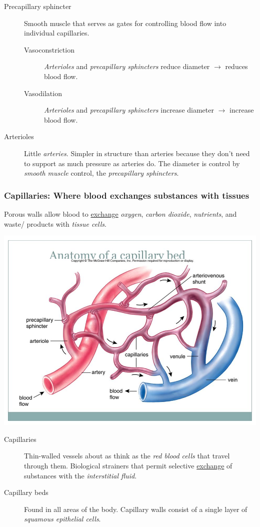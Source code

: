\documentclass[11pt]{article}
\begin{document}
\begin{description}
\item[{Precapillary sphincter}] Smooth muscle that serves as gates for
controlling blood flow into individual capillaries.
\begin{description}
\item[{Vasoconstriction}] \emph{Arterioles} and \emph{precapillary sphincters} reduce
diameter \(\rightarrow\) reduces blood flow.
\item[{Vasodilation}] \emph{Arterioles} and \emph{precapillary sphincters} increase diameter
\(\rightarrow\) increase blood flow.
\end{description}
\item[{Arterioles}] Little \emph{arteries}. Simpler in structure than arteries because
they don't need to support as much pressure as arteries do. The
diameter is control by \emph{smooth muscle} control, the \emph{precapillary
sphincters}.
\end{description}

\subsubsection{Capillaries: Where blood exchanges substances with tissues}
\label{sec:org9edbd6c}
Porous walls allow blood to \uline{exchange} \emph{oxygen}, \emph{carbon dioxide}, \emph{nutrients}, and
waste/ products with \emph{tissue cells}.

\begin{center}
\includegraphics[width=.9\linewidth]{Ch. 8/slide_19_2016-10-25_22-44-43.jpg}
\end{center}

\begin{description}
\item[{Capillaries}] Thin-walled vessels about as think as the \emph{red blood cells}
that travel through them. Biological strainers that permit selective
\uline{exchange} of substances with the \emph{interstitial fluid}.
\item[{Capillary beds}] Found in all areas of the body. Capillary walls consist
of a single layer of \emph{squamous epithelial cells}.
\end{description}
\end{document}
